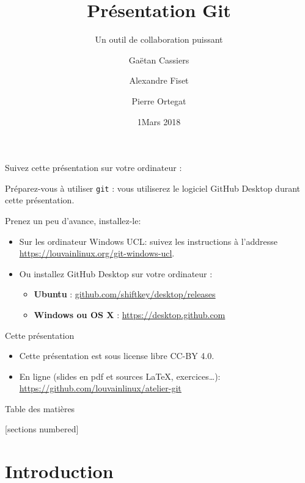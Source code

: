 \documentclass{beamer}
\title{Présentation Git}
\subtitle{Un outil de collaboration puissant}
\date{1\ier Mars 2018}
\author{Gaëtan Cassiers \and Alexandre Fiset \and Pierre Ortegat}
\institute{KAP Louvain-li-Nux}
\begin{document}
\begin{frame}
\begin{center}
  Suivez cette présentation sur votre ordinateur :

\end{center}

Préparez-vous à utiliser \texttt{git} :
vous utiliserez le logiciel GitHub Desktop durant cette présentation.

Prenez un peu d'avance, installez-le:
\begin{itemize}
    \item Sur les ordinateur Windows UCL: suivez les instructions à l'addresse \url{https://louvainlinux.org/git-windows-ucl}.
    \item Ou installez GitHub Desktop sur votre ordinateur :
    \begin{itemize}
        \item \textbf{Ubuntu} : \url{github.com/shiftkey/desktop/releases}
        \item \textbf{Windows ou OS X} : \url{https://desktop.github.com}
    \end{itemize}
\end{itemize}
\end{frame}


\maketitle

\begin{frame}{Cette présentation}
    \begin{itemize}
        \item Cette présentation est sous license libre CC-BY 4.0.
        \item En ligne (slides en pdf et sources \LaTeX, exercices\ldots):
            \url{https://github.com/louvainlinux/atelier-git}
    \end{itemize}
\end{frame}

\begin{frame}{Table des matières}

[sections numbered]
\tableofcontents[hideallsubsections]

\end{frame}

\section{Introduction}
\end{document}
